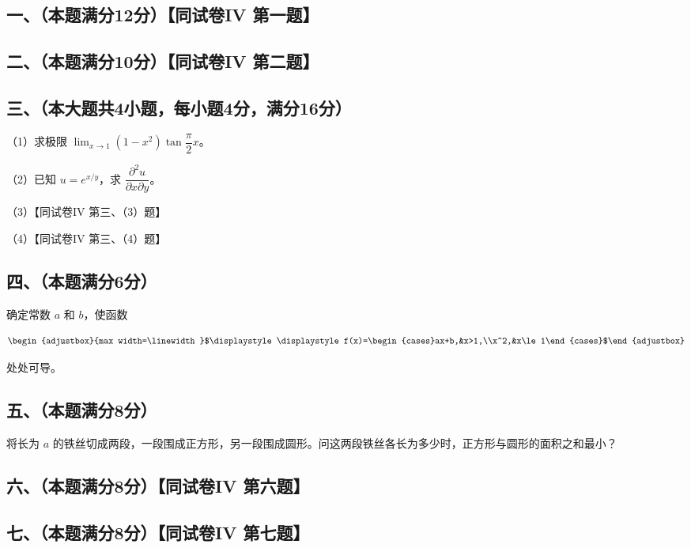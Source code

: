 \documentclass[UTF8,12pt]{ctexart}
\newcommand{\fitmath}[1]{\begin{adjustbox}{max width=\linewidth}$\displaystyle #1$\end{adjustbox}}
\begin{document}
\subsection*{一、（本题满分12分）【同试卷IV 第一题】}

\subsection*{二、（本题满分10分）【同试卷IV 第二题】}

\subsection*{三、（本大题共4小题，每小题4分，满分16分）}

（1）求极限 \(\displaystyle \lim_{x\to1}(1-x^2)\tan\dfrac{\displaystyle \pi}{\displaystyle 2}x\)。


（2）已知 \(\displaystyle u=e^{x/y}\)，求 \(\displaystyle \dfrac{\displaystyle \partial^2u}{\displaystyle \partial x\partial y}\)。


（3）【同试卷IV 第三、（3）题】


（4）【同试卷IV 第三、（4）题】


\subsection*{四、（本题满分6分）}

确定常数 \(\displaystyle a\) 和 \(\displaystyle b\)，使函数


\[\fitmath{\displaystyle f(x)=\begin{cases}ax+b,&x>1,\\x^2,&x\le1\end{cases}}\]


处处可导。


\subsection*{五、（本题满分8分）}

将长为 \(\displaystyle a\) 的铁丝切成两段，一段围成正方形，另一段围成圆形。问这两段铁丝各长为多少时，正方形与圆形的面积之和最小？


\subsection*{六、（本题满分8分）【同试卷IV 第六题】}

\subsection*{七、（本题满分8分）【同试卷IV 第七题】}
\end{document}
